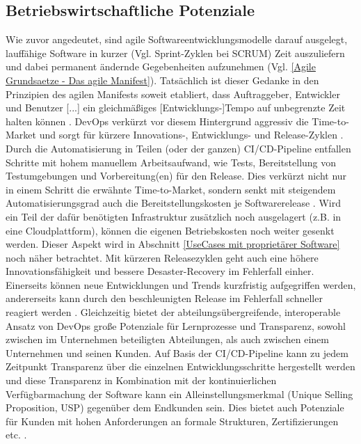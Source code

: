 \subsection{Betriebswirtschaftliche Potenziale}
\label{Betriebswirtschaftliche Potenziale}
Wie zuvor angedeutet, sind agile Softwareentwicklungsmodelle darauf ausgelegt, lauffähige Software in kurzer (Vgl. Sprint-Zyklen bei \gls{SCRUM}) Zeit auszuliefern und dabei permanent ändernde Gegebenheiten aufzunehmen (Vgl. \ref{Agile Grundsaetze - Das agile Manifest}). Tatsächlich ist dieser Gedanke in den Prinzipien des agilen Manifests soweit etabliert, dass \glqq Auftraggeber, Entwickler und Benutzer [...] ein gleichmäßiges [Entwicklungs-]Tempo auf unbegrenzte Zeit halten können\grqq{} \cite{beck_prinzipien_2001}.\newline
\gls{DevOps} verkürzt vor diesem Hintergrund aggressiv die \gls{Time-to-Market} und sorgt für kürzere Innovations-, Entwicklungs- und Release-Zyklen \cite{forsgren_devops_2015}. Durch die Automatisierung in Teilen (oder der ganzen) \acrshort{CI}/\acrshort{CD}-Pipeline entfallen Schritte mit hohem manuellem Arbeitsaufwand, wie Tests, Bereitstellung von Testumgebungen und Vorbereitung(en) für den Release. Dies verkürzt nicht nur in einem Schritt die erwähnte \gls{Time-to-Market}, sondern senkt mit steigendem Automatisierungsgrad auch die Bereitstellungskosten je Softwarerelease \cite{forsgren_devops_2015}.
Wird ein Teil der dafür benötigten Infrastruktur zusätzlich noch ausgelagert (z.B. in eine Cloudplattform), können die eigenen Betriebskosten noch weiter gesenkt werden. Dieser Aspekt wird in Abschnitt \ref{UseCases mit proprietärer Software} noch näher betrachtet.\newline
Mit kürzeren Releasezyklen geht auch eine höhere Innovationsfähigkeit und bessere Desaster-Recovery im Fehlerfall einher. Einerseits können neue Entwicklungen und Trends kurzfristig aufgegriffen werden, andererseits kann durch den beschleunigten Release im Fehlerfall schneller reagiert werden \cite{forsgren_devops_2015}.
Gleichzeitig bietet der abteilungsübergreifende, interoperable Ansatz von \gls{DevOps} große Potenziale für Lernprozesse und Transparenz, sowohl zwischen im Unternehmen beteiligten Abteilungen, als auch zwischen einem Unternehmen und seinen Kunden.
Auf Basis der \acrshort{CI}/\acrshort{CD}-Pipeline kann zu jedem Zeitpunkt Transparenz über die einzelnen Entwicklungsschritte hergestellt werden und diese Transparenz in Kombination mit der kontinuierlichen Verfügbarmachung der Software kann ein Alleinstellungsmerkmal (Unique Selling Proposition, \acrshort{USP}) gegenüber dem Endkunden sein. Dies bietet auch Potenziale für Kunden mit hohen Anforderungen an formale Strukturen, Zertifizierungen etc. \cite[Kap. 7.2]{leite_survey_2020}.